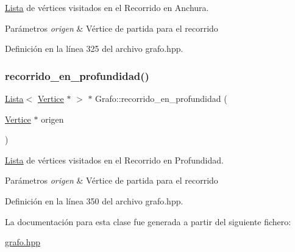 \hyperlink{classLista}{Lista} de vértices visitados en el Recorrido en Anchura. 


\begin{DoxyParams}{Parámetros}
{\em origen} & Vértice de partida para el recorrido \\
\hline
\end{DoxyParams}


Definición en la línea 325 del archivo grafo.\+hpp.

\mbox{\label{classGrafo_ae2773db77afaab3b02a8237b93091818}} 
\subsubsection{\texorpdfstring{recorrido\+\_\+en\+\_\+profundidad()}{recorrido\_en\_profundidad()}}
{\footnotesize\ttfamily \hyperlink{classLista}{Lista}$<$ \hyperlink{classVertice}{Vertice} $\ast$ $>$ $\ast$ Grafo\+::recorrido\+\_\+en\+\_\+profundidad (\begin{DoxyParamCaption}\item[{\hyperlink{classVertice}{Vertice} $\ast$}]{origen }\end{DoxyParamCaption})}



\hyperlink{classLista}{Lista} de vértices visitados en el Recorrido en Profundidad. 


\begin{DoxyParams}{Parámetros}
{\em origen} & Vértice de partida para el recorrido \\
\hline
\end{DoxyParams}


Definición en la línea 350 del archivo grafo.\+hpp.



La documentación para esta clase fue generada a partir del siguiente fichero\+:\begin{DoxyCompactItemize}
\item 
\hyperlink{grafo_8hpp}{grafo.\+hpp}\end{DoxyCompactItemize}
